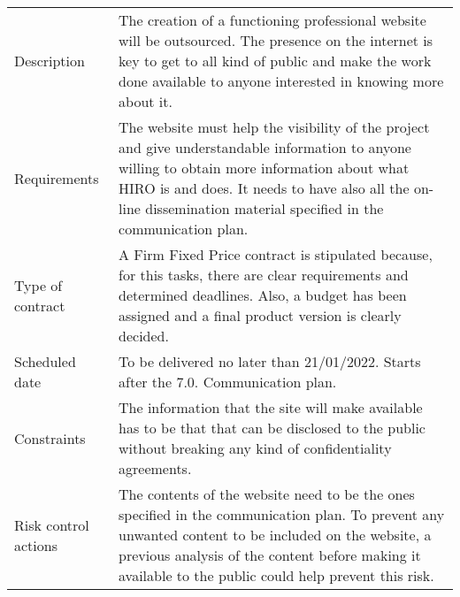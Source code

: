 \begin{table}[H]
	\centering
	\begin{tabular}{>{\raggedright\arraybackslash}p{3cm} >{\arraybackslash}p{11cm}}
		
		\toprule[2pt]
		
		\multicolumn{2}{c}{\textbf{SOW - 7.2.1. Website development}}\\
		
		\midrule[1.5pt]
		
		Description & The creation of a functioning professional website will be outsourced. The presence on the internet is key to get to all kind of public and make the work done available to anyone interested in knowing more about it.\vspace{0.2cm} \\
		
		\midrule
		
		Requirements & The website must help the visibility of the project and give understandable information to anyone willing to obtain more information about what HIRO is and does. It needs to have also all the on-line dissemination material specified in the communication plan.\vspace{0.2cm} \\
		
		\midrule
		
		Type of contract & A Firm Fixed Price contract is stipulated because, for this tasks, there are clear requirements and determined deadlines. Also, a budget has been assigned and a final product version is clearly decided.\vspace{0.2cm} \\
		
		\midrule
		
		Scheduled date & To be delivered no later than 21/01/2022. Starts after the 7.0. Communication plan.\vspace{0.2cm} \\
		
		\midrule
		
		Constraints & The information that the site will make available has to be that that can be disclosed to the public without breaking any kind of confidentiality agreements.\vspace{0.2cm} \\
		
		\midrule
		
		Risk control actions & The contents of the website need to be the ones specified in the communication plan. To prevent any unwanted content to be included on the website, a previous analysis of the content before making it available to the public could help prevent this risk.\vspace{0.2cm} \\
		

\end{tabular}
\end{table}
